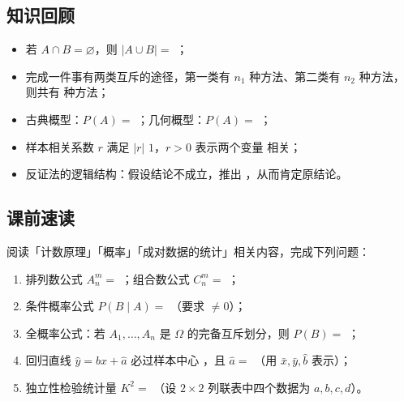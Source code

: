 \begin{preview}
\subsection*{知识回顾}
\begin{itemize}
  \item 若 $A\cap B=\varnothing$，则 $|A\cup B|=$ \blank；
  \item 完成一件事有两类互斥的途径，第一类有 $n_1$ 种方法、第二类有 $n_2$ 种方法，则共有 \blank 种方法；
  \item 古典概型：$P(A)=$ \blank；几何概型：$P(A)=$ \blank；
  \item 样本相关系数 $r$ 满足 $|r|$ \blank $1$，$r>0$ 表示两个变量 \blank 相关；
  \item 反证法的逻辑结构：假设结论不成立，推出 \blank，从而肯定原结论。
\end{itemize}

\subsection*{课前速读}
阅读「计数原理」「概率」「成对数据的统计」相关内容，完成下列问题：
\begin{enumerate}
  \item 排列数公式 $A_n^m=$ \blank；组合数公式 $C_n^m=$ \blank；
  \item 条件概率公式 $P(B\mid A)=$ \blank（要求 \blank $\ne0$）；
  \item 全概率公式：若 $A_1,\dots,A_n$ 是 $\Omega$ 的完备互斥划分，则 $P(B)=$ \blank；
  \item 回归直线 $\hat y=\hat bx+\hat a$ 必过样本中心 \blank，且 $\hat a=$ \blank（用 $\bar x,\bar y,\hat b$ 表示）；
  \item 独立性检验统计量 $K^2=$ \blank（设 $2\times2$ 列联表中四个数据为 $a,b,c,d$）。
\end{enumerate}
\end{preview}

